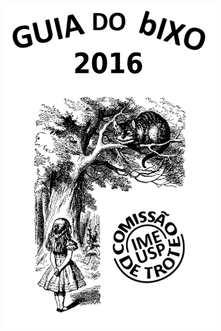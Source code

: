 \documentclass[12pt,twoside]{report}
\begin{document}
\begin{figure}[p]
  \begin{center}
    \includegraphics[height=1.05\textheight]{img/capa_2016.pdf} %
  \end{center}
\end{figure}
\thispagestyle{empty} %
\clearpage
\newpage




\end{document}
